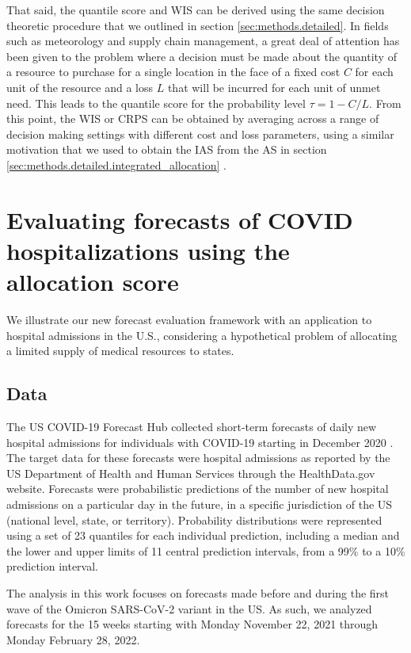 \documentclass{article}\usepackage[]{graphicx}\usepackage[]{xcolor}
\begin{document}
That said, the quantile score and WIS can be derived using the same decision theoretic procedure that we outlined in
section \ref{sec:methods.detailed}. In fields such as meteorology and supply chain management, a great deal of attention
has been given to the problem where a decision must be made about the quantity of a resource to purchase for a single
location in the face of a fixed cost $C$ for each unit of the resource and a loss $L$ that will be incurred for each
unit of unmet need. This leads to the quantile score for the probability level $\tau = 1 - C/L$. From this point, the
WIS or CRPS can be obtained by averaging across a range of decision making settings with different cost and loss
parameters, using a similar motivation that we used to obtain the IAS from the AS in section
\ref{sec:methods.detailed.integrated_allocation} \citep{gneiting2011weightedScoringRules}.

\section{Evaluating forecasts of COVID hospitalizations using the allocation score}
\label{sec:application}

We illustrate our new forecast evaluation framework with an application to hospital admissions in the U.S., considering
a hypothetical problem of allocating a limited supply of medical resources to states.

\subsection{Data}


The US COVID-19 Forecast Hub collected short-term forecasts of daily new hospital admissions for individuals with
COVID-19 starting in December 2020 \citep{cramer_united_2022}. The target data for these forecasts were hospital
admissions as reported by the US Department of Health and Human Services through the HealthData.gov website. Forecasts
were probabilistic predictions of the number of new hospital admissions on a particular day in the future, in a specific
jurisdiction of the US (national level, state, or territory). Probability distributions were represented using a set of
23 quantiles for each individual prediction, including a median and the lower and upper limits of 11 central prediction
intervals, from a 99\% to a 10\% prediction interval.

The analysis in this work focuses on forecasts made before and during the first wave of the Omicron SARS-CoV-2 variant
in the US. As such, we analyzed forecasts for the 15 weeks starting with Monday November 22, 2021 through Monday
February 28, 2022.
\end{document}

